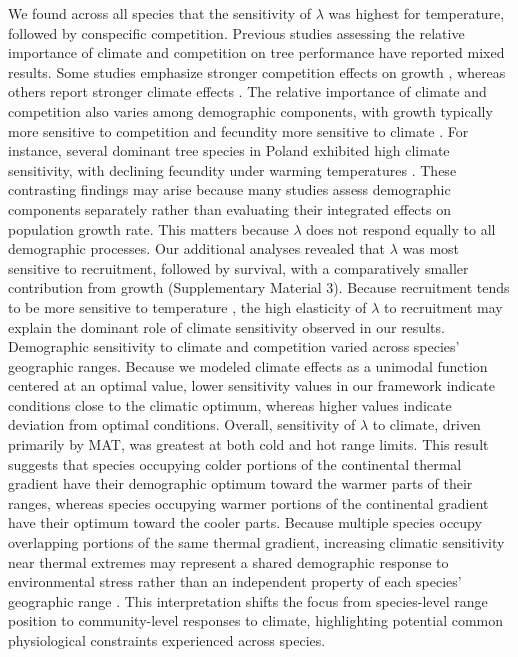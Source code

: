 We found across all species that the sensitivity of \(\lambda\) was
highest for temperature, followed by conspecific competition. Previous
studies assessing the relative importance of climate and competition on
tree performance have reported mixed results. Some studies emphasize
stronger competition effects on growth
\citep{GomezAparicio2011, LeSquin2021}, whereas others report stronger
climate effects \citep{CopenhaverParry2016}. The relative importance of
climate and competition also varies among demographic components, with
growth typically more sensitive to competition and fecundity more
sensitive to climate \citep{Clark2011}. For instance, several dominant
tree species in Poland exhibited high climate sensitivity, with
declining fecundity under warming temperatures \citep{foest2025forest}.
These contrasting findings may arise because many studies assess
demographic components separately rather than evaluating their
integrated effects on population growth rate. This matters because
\(\lambda\) does not respond equally to all demographic processes. Our
additional analyses revealed that \(\lambda\) was most sensitive to
recruitment, followed by survival, with a comparatively smaller
contribution from growth (Supplementary Material 3). Because recruitment
tends to be more sensitive to temperature
\citep{Clark2011, foest2025forest}, the high elasticity of \(\lambda\)
to recruitment may explain the dominant role of climate sensitivity
observed in our results.\\

Demographic sensitivity to climate and competition varied across
species' geographic ranges. Because we modeled climate effects as a
unimodal function centered at an optimal value, lower sensitivity values
in our framework indicate conditions close to the climatic optimum,
whereas higher values indicate deviation from optimal conditions.
Overall, sensitivity of \(\lambda\) to climate, driven primarily by MAT,
was greatest at both cold and hot range limits. This result suggests
that species occupying colder portions of the continental thermal
gradient have their demographic optimum toward the warmer parts of their
ranges, whereas species occupying warmer portions of the continental
gradient have their optimum toward the cooler parts. Because multiple
species occupy overlapping portions of the same thermal gradient,
increasing climatic sensitivity near thermal extremes may represent a
shared demographic response to environmental stress rather than an
independent property of each species' geographic range
\citep{Korner2021}. This interpretation shifts the focus from
species-level range position to community-level responses to climate,
highlighting potential common physiological constraints experienced
across species.\\

